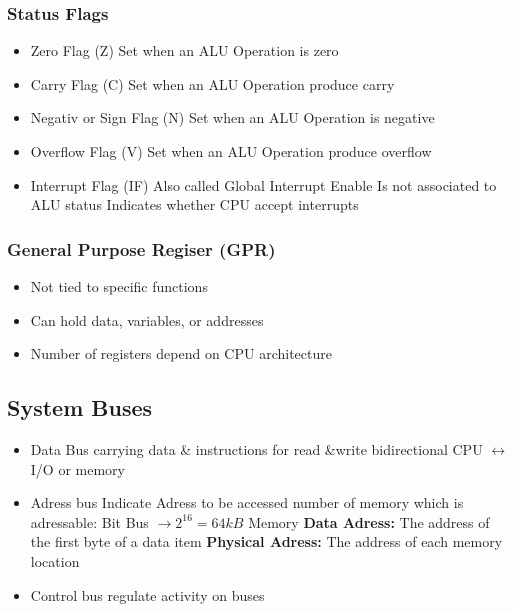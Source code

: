 \begin{multicols}{2}
	\subsubsection{Status Flags}
	\begin{itemize}
		\item Zero Flag (Z)
		\subitem Set when an \acs{ALU} Operation is zero
		\item Carry Flag (C)
		\subitem Set when an \acs{ALU} Operation produce carry
		\item Negativ or Sign Flag (N)
		\subitem Set when an \acs{ALU} Operation is negative
		\item Overflow Flag (V)
		\subitem Set when an \acs{ALU} Operation produce overflow
		\item Interrupt Flag (IF)
		\subitem Also called Global Interrupt Enable
		\subitem Is not associated to \acs{ALU} status
		\subitem Indicates whether \acs{CPU} accept interrupts
	\end{itemize}

	\subsubsection{General Purpose Regiser (\acs{GPR})}
    \begin{itemize}
        \item Not tied to specific functions
        \item Can hold data, variables, or addresses
        \item Number of registers depend on \acs{CPU} architecture			
    \end{itemize}

\end{multicols}
\subsection{System Buses }
\vspace{-0.3cm}
	\begin{multicols}{2}
	\begin{itemize}
		\item Data Bus
		\subitem carrying data \& instructions for read \&write
		\subitem bidirectional \acs{CPU} $\leftrightarrow$ \acs{I/O} or memory
		\item Adress bus
		\subitem Indicate Adress to be accessed
		\subitem number of memory which is adressable: 
		 Bit Bus $\rightarrow 2^{16}=64kB$ Memory
		\subitem \textbf{Data Adress:}
		\subitem The address of the first byte of a data item
		\subitem \textbf{Physical Adress:} 
		\subitem The address of each memory location
		\item Control bus
		\subitem regulate activity on buses		
	\end{itemize}
	\end{multicols}
\clearpage

